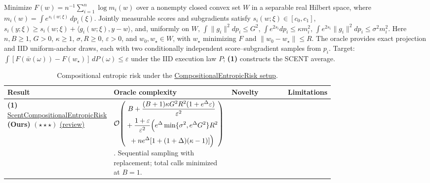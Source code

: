 \begin{table}[tp]
\centering
\caption{Compositional entropic risk under the \href{https://github.com/k3nfalt/longtails/blob/main/LongTails/Setups/CompositionalEntropicRisk.lean}{CompositionalEntropicRisk setup}.}\label{tab:CompositionalEntropicRisk}
\parbox{\linewidth}{\footnotesize Minimize $F(w)=n^{-1}\sum_{i=1}^n\log m_i(w)$ over a nonempty closed convex set $W$ in a separable real Hilbert space, where $m_i(w)=\int e^{s_i(w;\xi)}\,dp_i(\xi)$. Jointly measurable scores and subgradients satisfy $s_i(w;\xi)\in[c_0,c_1]$, $s_i(y;\xi)\ge s_i(w;\xi)+\langle g_i(w;\xi),y-w\rangle$, and, uniformly on $W$, $\int\|g_i\|^2dp_i\le G^2$, $\int e^{2s_i}dp_i\le\kappa m_i^2$, $\int e^{2s_i}\|g_i\|^2dp_i\le\sigma^2m_i^2$. Here $n,B\ge1$, $G>0$, $\kappa\ge1$, $\sigma,R\ge0$, $\varepsilon>0$, and $w_0,w_\star\in W$, with $w_\star$ minimizing $F$ and $\|w_0-w_\star\|\le R$. The oracle provides exact projection and IID uniform-anchor draws, each with two conditionally independent score--subgradient samples from $p_i$. Target: $\int[F(\bar w(\omega))-F(w_\star)]\,dP(\omega)\le\varepsilon$ under the IID execution law $P$; \textbf{(1)} constructs the SCENT average.}\par\smallskip
\begin{threeparttable}
\footnotesize
\setlength{\tabcolsep}{4pt}\renewcommand{\arraystretch}{1.25}
\begin{tabularx}{\linewidth}{@{}>{\raggedright\arraybackslash}p{0.20\linewidth}>{\raggedright\arraybackslash}p{0.32\linewidth}>{\raggedright\arraybackslash}p{0.25\linewidth}>{\raggedright\arraybackslash}X@{}}
\toprule
\textbf{Result} & \textbf{Oracle complexity} & \textbf{Novelty} & \textbf{Limitations} \\
\midrule
\textbf{(1)} \href{https://github.com/k3nfalt/longtails/blob/main/LongTails/Theorems/ScentCompositionalEntropicRisk.lean}{Scent\allowbreak Compositional\allowbreak Entropic\allowbreak Risk} \textbf{(Ours)} $(\star\star\star)$ \href{https://github.com/k3nfalt/longtails/blob/main/scripts/reviews/ScentCompositionalEntropicRisk.md}{(review)}
& $\displaystyle\mathcal{O}\!\left(\begin{gathered}
 B+\frac{(B+1)\kappa G^2R^2(1+e^\Delta\varepsilon)}{\varepsilon^2}\\
 {}+\frac{1+\varepsilon}{\varepsilon^2}\Bigl(e^\Delta\min\{\sigma^2,e^\Delta G^2\}R^2\\
 {}+ne^\Delta[1+(1+\Delta)(\kappa-1)]\Bigr)
\end{gathered}\right)$.
Sequential sampling with replacement; total calls minimized at $B=1$.

\end{tabularx}
\end{threeparttable}
\end{table}
